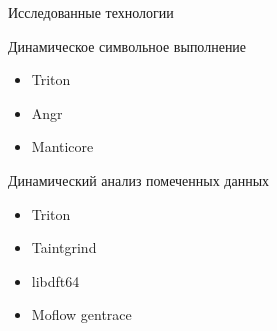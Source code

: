 \documentclass[10pt]{beamer}
\begin{document}

\begin{frame}{Исследованные технологии}
  \begin{block}{Динамическое символьное выполнение}
    \begin{itemize}
      \item Triton
      \item Angr
      \item Manticore
    \end{itemize}
  \end{block}
    \begin{block}{Динамический анализ помеченных данных}
    \begin{itemize}
      \item Triton 
      \item Taintgrind
      \item libdft64
      \item Moflow gentrace
    \end{itemize}
  \end{block}
\end{frame}
\end{document}
